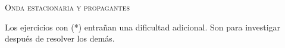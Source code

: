\documentclass[11pt, spanish, a4paper, twopage]{article}
\begin{document}
\begin{center}
	\textsc{\LARGE Onda estacionaria y propagantes}
\end{center}


Los ejercicios con (*) entrañan una dificultad adicional. Son para investigar después de resolver los demás.



\begin{enumerate}


}




\end{enumerate}
\end{document}
